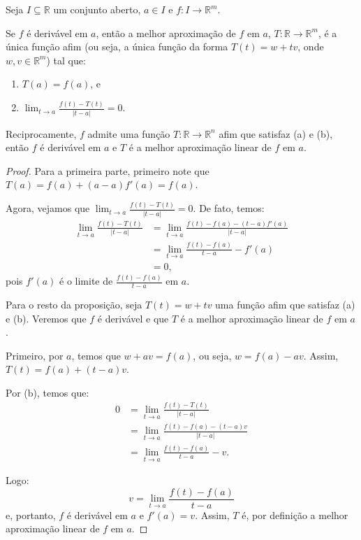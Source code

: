 \begin{proposition}
    Seja $I\subseteq \mathbb R$ um conjunto aberto, $a \in I$ e $f: I\rightarrow \mathbb R^m$.

    Se $f$ é derivável em $a$, então a melhor aproximação de $f$ em $a$, $T: \mathbb R \to \mathbb R^m$, é a única função afim (ou seja, a única função da forma $T(t) = w + t v$, onde $w, v \in \mathbb R^m$) tal que:
\begin{enumerate}[label=(\alph*)]
    \item $T(a)=f(a)$, e
    \item $\lim_{t \to a} \frac{f(t)-T(t)}{|t-a|} = 0$.
\end{enumerate}
    Reciprocamente, $f$ admite uma função $T: \mathbb R \rightarrow \mathbb R^n$ afim que satisfaz (a) e (b), então $f$ é derivável em $a$ e $T$ é a melhor aproximação linear de $f$ em $a$.
\end{proposition}
\begin{proof}
    Para a primeira parte, primeiro note que $T(a) = f(a) + (a-a)f'(a) = f(a)$.

    Agora, vejamos que $\lim_{t \to a} \frac{f(t)-T(t)}{|t-a|} = 0$.
    De fato, temos:
    \begin{align*}
        \lim_{t \to a} \frac{f(t)-T(t)}{|t-a|} &= \lim_{t \to a} \frac{f(t)-f(a)-(t-a)f'(a)}{|t-a|} \\
        &= \lim_{t \to a} \frac{f(t)-f(a)}{t-a}-f'(a) \\
        &= 0,
    \end{align*}
    pois $f'(a)$ é o limite de $\frac{f(t)-f(a)}{t-a}$ em $a$.

    Para o resto da proposição, seja $T(t) = w + t v$ uma função afim que satisfaz (a) e (b).
    Veremos que $f$ é derivável e que $T$ é a melhor aproximação linear de $f$ em $a$.

    Primeiro, por $a$, temos que $w + a v = f(a)$, ou seja, $w = f(a) - a v$.
    Assim, $T(t) = f(a) + (t-a)v$.

    Por (b), temos que:
    \begin{align*}
        0 &= \lim_{t \to a} \frac{f(t)-T(t)}{|t-a|} \\
        &= \lim_{t \to a} \frac{f(t)-f(a)-(t-a)v}{|t-a|} \\
        &= \lim_{t \to a} \frac{f(t)-f(a)}{t-a}-v.
    \end{align*}

    Logo:
    \begin{equation*}
        v = \lim_{t \to a} \frac{f(t)-f(a)}{t-a}
    \end{equation*}
    e, portanto, $f$ é derivável em $a$ e $f'(a) = v$.
    Assim, $T$ é, por definição a melhor aproximação linear de $f$ em $a$.
\end{proof}
